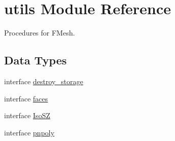 \hypertarget{namespaceutils}{}\section{utils Module Reference}
\label{namespaceutils}


Procedures for F\+Mesh.  


\subsection*{Data Types}
\begin{DoxyCompactItemize}
\item 
interface \hyperlink{interfaceutils_1_1destroy__storage}{destroy\+\_\+storage}
\item 
interface \hyperlink{interfaceutils_1_1faces}{faces}
\item 
interface \hyperlink{interfaceutils_1_1_iso_s_z}{Iso\+SZ}
\item 
interface \hyperlink{interfaceutils_1_1pnpoly}{pnpoly}
\end{DoxyCompactItemize}
